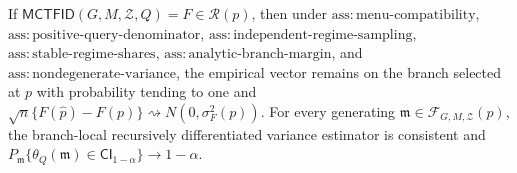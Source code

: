 If \(\mathsf{MCTFID}(G,M,\mathcal Z,Q)=F\in\mathcal R(p)\), then under \(\mathrm{ass:menu\text{-}compatibility}\), \(\mathrm{ass:positive\text{-}query\text{-}denominator}\), \(\mathrm{ass:independent\text{-}regime\text{-}sampling}\), \(\mathrm{ass:stable\text{-}regime\text{-}shares}\), \(\mathrm{ass:analytic\text{-}branch\text{-}margin}\), and \(\mathrm{ass:nondegenerate\text{-}variance}\), the empirical vector remains on the branch selected at \(p\) with probability tending to one and \(\sqrt n\{F(\widehat p)-F(p)\}\rightsquigarrow N(0,\sigma_F^2(p))\). For every generating \(\mathfrak m\in\mathcal F_{G,M,\mathcal Z}(p)\), the branch-local recursively differentiated variance estimator is consistent and \(P_{\mathfrak m}\{\theta_Q(\mathfrak m)\in\mathsf{CI}_{1-\alpha}\}\to1-\alpha\).